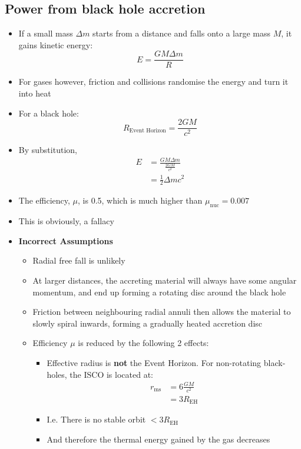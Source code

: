 \documentclass{article}
\begin{document}
\subsection{Power from black hole accretion}
\begin{itemize}
\item If a small mass $\Delta m$ starts from a distance and falls onto a large mass $M$, it gains kinetic energy:
\begin{equation}
E=\frac{GM \Delta m}{R}
\end{equation}
\item For gases however, friction and collisions randomise the energy and turn it into heat
\item For a black hole:
\begin{equation}
R_\text{Event Horizon}=\frac{2GM}{c^2}
\end{equation}
\item By substitution,
\begin{align}
E&=\frac{GM \Delta m}{\frac{2GM}{c^2}}\\
&=\frac{1}{2}\Delta m c^2
\end{align}
\item The efficiency, $\mu$, is 0.5, which is much higher than $\mu_\text{nuc}=0.007$
\item This is obviously, a fallacy
\item \textbf{Incorrect Assumptions}
\begin{itemize}
\item Radial free fall is unlikely
\item At larger distances, the
accreting material will always have some angular momentum, and end up forming a rotating disc around the black hole
\item Friction between neighbouring radial annuli then allows
the material to slowly spiral inwards, forming a gradually heated accretion disc
\item Efficiency $\mu$ is reduced by the following 2 effects:
\begin{itemize}
\item Effective radius is \textbf{not} the Event Horizon. For non-rotating black-holes, the ISCO is located at:
\begin{align}
r_\text{ms}&=6\frac{GM}{c^2}\\
&=3R_\text{EH}
\end{align}
\item I.e. There is no stable orbit $<3R_\text{EH}$
\item And therefore the thermal energy gained by the gas decreases

\end{itemize}
\end{itemize}
\end{itemize}
\end{document}
